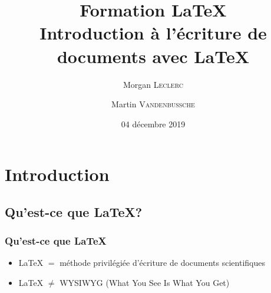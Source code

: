 \documentclass[10pt,svgnames,usenames,table]{beamer} %
\institute{Louvain-li-Nux}
\title{\textbf{Formation \LaTeX}\\
Introduction à l'écriture de documents avec \LaTeX}
\author{Morgan \textsc{Leclerc} \and Martin \textsc{Vandenbussche}}
\date{04 décembre 2019}
\begin{document}
%


\begin{frame}
  \maketitle

\end{frame}


\section{Introduction}
\subsection{Qu'est-ce que \LaTeX{}?}
\begin{frame}
\frametitle{Qu'est-ce que \LaTeX}

\begin{itemize}
\item \LaTeX{} $=$ méthode privilégiée d'écriture de documents scientifiques
 \vspace{0.5cm}
\item \LaTeX{} $ \neq$ WYSIWYG (What You See Is What You Get)
\end{itemize}

\end{frame}
\end{document}
